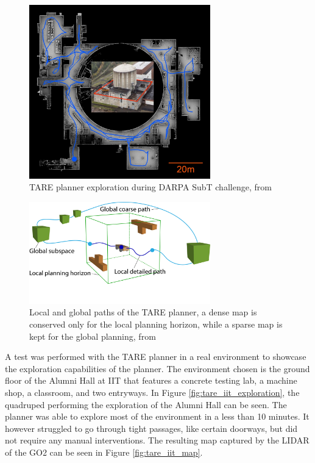 \documentclass[12pt]{article}
\begin{document}
        \begin{figure}[H]
            \centering
            \includegraphics[width=0.7\textwidth]{Images/tare_darpa_exploration.jpg}
            \caption{TARE planner exploration during DARPA SubT challenge, from \cite{tare}}
            \label{fig:tare_darpa_exploration}
        \end{figure}

        \begin{figure}[H]
            \centering
            \includegraphics[width=0.7\textwidth]{Images/tare.pdf}
            \caption{Local and global paths of the TARE planner, a dense map is conserved only for the local planning horizon, while a sparse map is kept for the global planning, from \cite{tare}}
            \label{fig:tare_local_global}
        \end{figure}


        A test was performed with the TARE planner in a real environment to showcase the exploration capabilities of the planner. The environment chosen is the ground floor of the Alumni Hall at IIT that features a concrete testing lab, a machine shop, a classroom, and two entryways. In Figure \ref{fig:tare_iit_exploration}, the quadruped performing the exploration of the Alumni Hall can be seen. The planner was able to explore most of the environment in a less than 10 minutes. It however struggled to go through tight passages, like certain doorways, but did not require any manual interventions. The resulting map captured by the LIDAR of the GO2 can be seen in Figure \ref{fig:tare_iit_map}.
\end{document}
